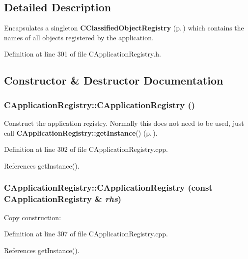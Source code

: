\subsection{Detailed Description}
Encapsulates a singleton {\bf CClassified\-Object\-Registry} {\rm (p.\,\pageref{classCClassifiedObjectRegistry})} which contains the names of all objects registered by the application. 



Definition at line 301 of file CApplication\-Registry.h.

\subsection{Constructor \& Destructor Documentation}
\subsubsection{\setlength{\rightskip}{0pt plus 5cm}CApplication\-Registry::CApplication\-Registry ()}\label{classCApplicationRegistry_a0}


Construct the application registry. Normally this does not need to be used, just call {\bf CApplication\-Registry::get\-Instance}() {\rm (p.\,\pageref{classCApplicationRegistry_d0})}. 

Definition at line 302 of file CApplication\-Registry.cpp.

References get\-Instance().
\subsubsection{\setlength{\rightskip}{0pt plus 5cm}CApplication\-Registry::CApplication\-Registry (const CApplication\-Registry \& {\em rhs})}\label{classCApplicationRegistry_a1}


Copy construction: 

Definition at line 307 of file CApplication\-Registry.cpp.

References get\-Instance().

